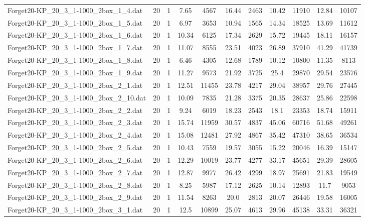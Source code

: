 \begin{table}[!ht]
\begin{tabular}{lcccccccccc}
Forget20-KP\_20\_3\_1-1000\_2box\_1\_4.dat & 20 & 1 & 7.65 & 4567 & 16.44 & 2463 & 10.42 & 11910 & 12.84 & 10107 \\
Forget20-KP\_20\_3\_1-1000\_2box\_1\_5.dat & 20 & 1 & 6.97 & 3653 & 10.94 & 1565 & 14.34 & 18525 & 13.69 & 11612 \\
Forget20-KP\_20\_3\_1-1000\_2box\_1\_6.dat & 20 & 1 & 10.34 & 6125 & 17.34 & 2629 & 15.72 & 19445 & 18.11 & 16157 \\
Forget20-KP\_20\_3\_1-1000\_2box\_1\_7.dat & 20 & 1 & 11.07 & 8555 & 23.51 & 4023 & 26.89 & 37910 & 41.29 & 41739 \\
Forget20-KP\_20\_3\_1-1000\_2box\_1\_8.dat & 20 & 1 & 6.46 & 4305 & 12.68 & 1789 & 10.12 & 10800 & 11.35 & 8113 \\
Forget20-KP\_20\_3\_1-1000\_2box\_1\_9.dat & 20 & 1 & 11.27 & 9573 & 21.92 & 3725 & 25.4 & 29870 & 29.54 & 23576 \\
Forget20-KP\_20\_3\_1-1000\_2box\_2\_1.dat & 20 & 1 & 12.51 & 11455 & 23.78 & 4217 & 29.04 & 38957 & 29.76 & 27445 \\
Forget20-KP\_20\_3\_1-1000\_2box\_2\_10.dat & 20 & 1 & 10.09 & 7835 & 21.28 & 3375 & 20.35 & 28637 & 25.86 & 22598 \\
Forget20-KP\_20\_3\_1-1000\_2box\_2\_2.dat & 20 & 1 & 9.24 & 6019 & 18.23 & 2543 & 18.1 & 23353 & 18.74 & 15911 \\
Forget20-KP\_20\_3\_1-1000\_2box\_2\_3.dat & 20 & 1 & 15.74 & 11959 & 30.57 & 4837 & 45.06 & 60716 & 51.68 & 49261 \\
Forget20-KP\_20\_3\_1-1000\_2box\_2\_4.dat & 20 & 1 & 15.08 & 12481 & 27.92 & 4867 & 35.42 & 47310 & 38.65 & 36534 \\
Forget20-KP\_20\_3\_1-1000\_2box\_2\_5.dat & 20 & 1 & 10.43 & 7559 & 19.57 & 3055 & 15.22 & 20046 & 16.39 & 15147 \\
Forget20-KP\_20\_3\_1-1000\_2box\_2\_6.dat & 20 & 1 & 12.29 & 10019 & 23.77 & 4277 & 33.17 & 45651 & 29.39 & 28605 \\
Forget20-KP\_20\_3\_1-1000\_2box\_2\_7.dat & 20 & 1 & 12.87 & 9977 & 26.42 & 4299 & 18.97 & 25691 & 21.83 & 19549 \\
Forget20-KP\_20\_3\_1-1000\_2box\_2\_8.dat & 20 & 1 & 8.25 & 5987 & 17.12 & 2625 & 10.14 & 12893 & 11.7 & 9053 \\
Forget20-KP\_20\_3\_1-1000\_2box\_2\_9.dat & 20 & 1 & 11.54 & 8263 & 20.0 & 2813 & 20.07 & 26446 & 19.58 & 16005 \\
Forget20-KP\_20\_3\_1-1000\_2box\_3\_1.dat & 20 & 1 & 12.5 & 10899 & 25.07 & 4613 & 29.96 & 45138 & 33.31 & 36321 \\

\end{tabular}
\end{table}
